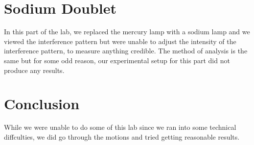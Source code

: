\documentclass[paper=a4, fontsize=11pt]{scrartcl} %
\numberwithin{equation}{section} %
\numberwithin{figure}{section} %
\numberwithin{table}{section} %
\begin{document}
\section{Sodium Doublet}
In this part of the lab, we replaced the mercury lamp with a sodium lamp and we viewed the interference pattern but were unable to adjust the intensity of the interference pattern, to measure anything credible. The method of analysis is the same but for some odd reason, our experimental setup for this part did not produce any results. 
\section{Conclusion}
While we were unable to do some of this lab since we ran into some technical diffculties, we did go through the motions and tried getting reasonable results. 
%
%

%
\end{document}
